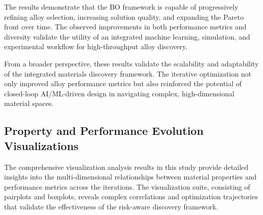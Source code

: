 The results demonstrate that the BO framework is capable of progressively refining alloy selection, increasing solution quality, and expanding the Pareto front over time. The observed improvements in both performance metrics and diversity validate the utility of an integrated machine learning, simulation, and experimental workflow for high-throughput alloy discovery.


From a broader perspective, these results validate the scalability and adaptability of the integrated materials discovery framework. The iterative optimization not only improved alloy performance metrics but also reinforced the potential of closed-loop AI/ML-driven design in navigating complex, high-dimensional material spaces.

\subsection{Property and Performance Evolution Visualizations}

The comprehensive visualization analysis results in this study provide detailed insights into the multi-dimensional relationships between material properties and performance metrics across the iterations. The visualization suite, consisting of pairplots and boxplots, reveals complex correlations and optimization trajectories that validate the effectiveness of the risk-aware discovery framework.





